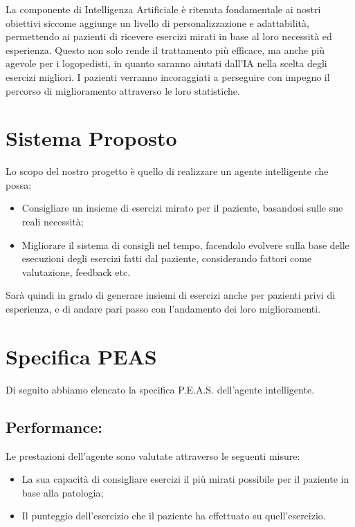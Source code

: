 \documentclass{article}
\begin{document}
    

    La componente di Intelligenza Artificiale è ritenuta fondamentale ai nostri obiettivi siccome aggiunge un livello di personalizzazione e adattabilità, permettendo ai pazienti di ricevere esercizi mirati in base al loro necessità ed esperienza. Questo non solo rende il trattamento più efficace, ma anche più agevole per i logopedisti, in quanto saranno aiutati dall'IA nella scelta degli esercizi migliori. I pazienti verranno incoraggiati a perseguire con impegno il percorso di miglioramento attraverso le loro statistiche.

    \section{Sistema Proposto}

    Lo scopo del nostro progetto è quello di realizzare un agente intelligente che possa:

    \begin{itemize}
        \item Consigliare un insieme di esercizi mirato per il paziente, basandosi sulle sue reali necessità;
        \item Migliorare il sistema di consigli nel tempo, facendolo evolvere sulla base delle esecuzioni degli esercizi fatti dal paziente, considerando fattori come valutazione, feedback etc.
    \end{itemize}

    Sarà quindi in grado di generare insiemi di esercizi anche per pazienti privi di esperienza, e di andare pari passo con l'andamento dei loro miglioramenti.

    \pagebreak

    \section{Specifica PEAS}

    Di seguito abbiamo elencato la specifica P.E.A.S. dell'agente intelligente.

    \subsection{Performance:}

    Le prestazioni dell’agente sono valutate attraverso le seguenti misure:

    \begin{itemize}
        \item La sua capacità di consigliare esercizi il più mirati possibile per il paziente in base alla patologia;
        \item Il punteggio dell'esercizio che il paziente ha effettuato su quell'esercizio.
    \end{itemize}
\end{document}

